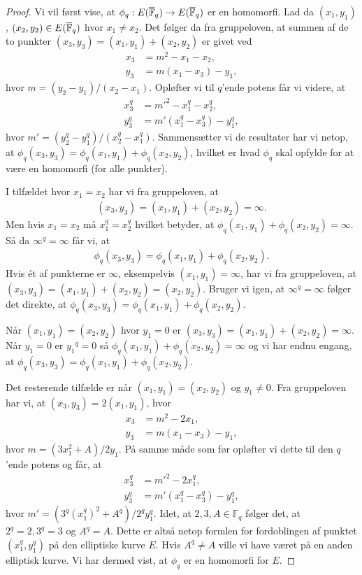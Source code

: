 \begin{proof}
Vi vil først vise, at $\phi_q : E(\overline{\mathbb{F}}_q) \to E(\overline{\mathbb{F}}_q)$ er en homomorfi. Lad da $(x_1, y_1)$, $(x_2, y_2) \in E(\overline{\mathbb{F}}_q)$ hvor $x_1 \neq x_2$. Det følger da fra gruppeloven, at summen af de to punkter $(x_3, y_3) = (x_1, y_1) + (x_2, y_2)$ er givet ved
\begin{align*}
	x_3 &= m^2 - x_1 - x_2, \\
	y_3 &= m(x_1 - x_3) - y_1, 
\end{align*}
hvor $m=(y_2-y_1)/(x_2-x_1)$.
Opløfter vi til $q$'ende potens får vi videre, at  
\begin{align*}
	x_{3}^{q} &= {m'}^2 - x_{1}^{q} - x_{2}^{q}, \\
	y_{3}^{q} &= m'(x_{1}^{q} - x_{3}^{q}) - y_{1}^{q},
\end{align*}
hvor $m' = (y_{2}^{q} - y_{1}^{q})/(x_{2}^{q} - x_{1}^{q})$. Sammensætter vi de resultater har vi netop, at $\phi_q(x_3, y_3) = \phi_q(x_1, y_1) + \phi_q(x_2, y_2)$, hvilket er hvad $\phi_q$ skal opfylde for at være en homomorfi (for alle punkter). 

I tilfældet hvor $x_1=x_2$ har vi fra gruppeloven, at 
\begin{align*}
	(x_3, y_3) =(x_1, y_1) + (x_2, y_2) = \infty.
\end{align*}
Men hvis $x_1 = x_2$ må $x_{1}^{q} = x_{2}^{q}$ hvilket betyder, at $\phi_q(x_1, y_1)+\phi_q(x_2, y_2) = \infty$. Så da $\infty^q = \infty$ får vi, at 
\begin{align*}
	\phi_q(x_3, y_3) = \phi_q(x_1, y_1) + \phi_q(x_2,  y_2).
\end{align*}
Hvis ét af punkterne er $\infty$, eksempelvis $(x_1, y_1)=\infty$, har vi fra gruppeloven, at 
$(x_3, y_3) = (x_1, y_1)+(x_2, y_2) = (x_2, y_2)$. Bruger vi igen, at $\infty^q = \infty$ følger det direkte, at 
$\phi_q(x_3, y_3) = \phi_q(x_1, y_1) + \phi_q(x_2, y_2)$.

Når $(x_1, y_1)=(x_2, y_2)$ hvor $y_1 = 0$ er $(x_3, y_3) = (x_1, y_1)+(x_2, y_2) = \infty$. Når $y_1=0$ er ${y_1}^q=0$ så $\phi_q(x_1, y_1) + \phi_q(x_2, y_2) = \infty$ og vi har endnu engang, at $\phi_q(x_3, y_3) = \phi_q(x_1, y_1) + \phi_q(x_2, y_2)$. 

Det resterende tilfælde er når $(x_1, y_1)=(x_2, y_2)$ og $y_1 \neq 0$. Fra gruppeloven har vi, at 
$(x_3, y_3)= 2(x_1, y_1)$, hvor
\begin{align*}
	x_3 &= m^2 - 2x_1, \\
	y_3 &= m(x_1-x_3)-y_1,
\end{align*}
hvor $m=(3x_{1}^{2} + A)/2y_1$. På samme måde som før opløfter vi dette til den $q$'ende potens og får, at 
\begin{align*}
	x_{3}^{q} &= {m'}^2 - 2 x_{1}^{q}, \\
	y_{3}^{q} &= m'(x_{1}^{q}- x_{3}^{q}) - y_{1}^{q},
\end{align*}
hvor $m' = (3^q (x_{1}^{q})^2 + A^q)/2^q y_{1}^{q}$.
Idet, at $2, 3, A \in \mathbb{F}_q$ følger det, at $2^q = 2, 3^q = 3$ og $A^q = A$. Dette er altså netop formlen for fordoblingen af punktet $(x_{1}^{q}, y_{1}^{q})$ på den elliptiske kurve $E$. Hvis $A^q \neq A$ ville vi have været på en anden elliptisk kurve. Vi har dermed vist, at $\phi_q $ er en homomorfi for $E$.


\end{proof}
